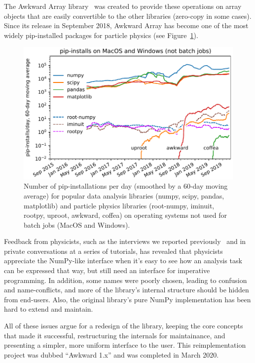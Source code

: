 \documentclass{webofc}
\begin{document}
The Awkward Array library~\cite{root-workshop-2018} was created to provide these operations on array objects that are easily convertible to the other libraries (zero-copy in some cases). Since its release in September 2018, Awkward Array has become one of the most widely pip-installed packages for particle physics (see Figure~\ref{fig:pip-timeline}).

\begin{figure}
\begin{center}
\includegraphics[width=0.75\linewidth]{pip-timeline.pdf}
\end{center}

\vspace{-0.25 cm}
\caption{Number of pip-installations per day (smoothed by a 60-day moving average) for popular data analysis libraries (numpy, scipy, pandas, matplotlib) and particle physics libraries (root-numpy, iminuit, rootpy, uproot, awkward, coffea) on operating systems not used for batch jobs (MacOS and Windows). \label{fig:pip-timeline}}
\end{figure}

Feedback from physicists, such as the interviews we reported previously~\cite{acat-2019} and in private conversations at a series of tutorials, has revealed that physicists appreciate the NumPy-like interface when it's easy to see how an analysis task can be expressed that way, but still need an interface for imperative programming. In addition, some names were poorly chosen, leading to confusion and name-conflicts, and more of the library's internal structure should be hidden from end-users. Also, the original library's pure NumPy implementation has been hard to extend and maintain.

All of these issues argue for a redesign of the library, keeping the core concepts that made it successful, restructuring the internals for maintainance, and presenting a simpler, more uniform interface to the user. This reimplementation project was dubbed ``Awkward 1.x'' and was completed in March 2020.
\end{document}
